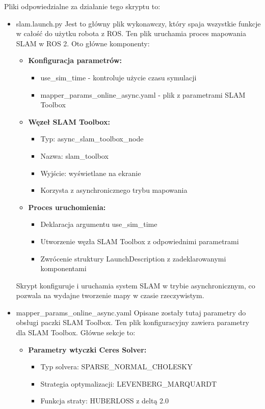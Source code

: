 \documentclass[a4paper,twoside,12pt]{book}
\begin{document}
Pliki odpowiedzialne za działanie tego skryptu to:
\begin{itemize}
	\item slam.launch.py
	Jest to główny plik wykonawczy, który spaja wszystkie funkcje w całość do użytku robota z ROS.
	Ten plik uruchamia proces mapowania SLAM w ROS 2. Oto główne komponenty:

	\begin{itemize}
	\item \textbf{Konfiguracja parametrów:}
		\begin{itemize}
		\item use\_sim\_time - kontroluje użycie czasu symulacji
		\item mapper\_params\_online\_async.yaml - plik z parametrami SLAM Toolbox
		\end{itemize}

	\item \textbf{Węzeł SLAM Toolbox:}
		\begin{itemize}
		\item Typ: async\_slam\_toolbox\_node
		\item Nazwa: slam\_toolbox
		\item Wyjście: wyświetlane na ekranie
		\item Korzysta z asynchronicznego trybu mapowania
		\end{itemize}

	\item \textbf{Proces uruchomienia:}
		\begin{itemize}
		\item Deklaracja argumentu use\_sim\_time
		\item Utworzenie węzła SLAM Toolbox z odpowiednimi parametrami
		\item Zwrócenie struktury LaunchDescription z zadeklarowanymi komponentami
		\end{itemize}
	\end{itemize}

	Skrypt konfiguruje i uruchamia system SLAM w trybie asynchronicznym, co pozwala na wydajne tworzenie mapy w czasie rzeczywistym.
	\newpage
	\item mapper\_params\_online\_async.yaml
	Opisane zostały tutaj parametry do obsługi paczki SLAM Toolbox.
	Ten plik konfiguracyjny zawiera parametry dla SLAM Toolbox. Główne sekcje to:

	\begin{itemize}
	\item \textbf{Parametry wtyczki Ceres Solver:}
		\begin{itemize}
		\item Typ solvera: SPARSE\_NORMAL\_CHOLESKY
		\item Strategia optymalizacji: LEVENBERG\_MARQUARDT
		\item Funkcja straty: HUBERLOSS z deltą 2.0
		\end{itemize}


\end{itemize}
\end{itemize}
\end{document}
